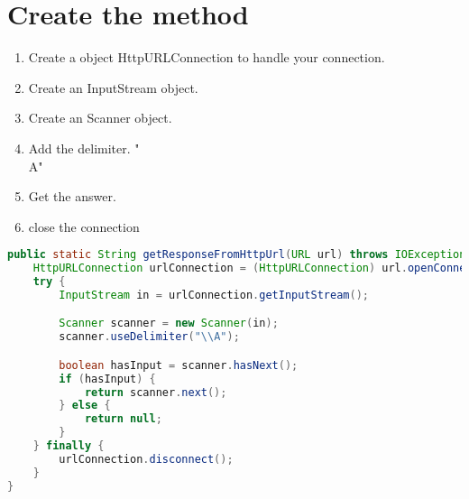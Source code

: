 \documentclass[12pt]{article} %
\begin{document}

\section{Create the method}

\begin{enumerate}
	\item Create a object HttpURLConnection to handle your connection.
	\item Create an InputStream object.
	\item Create an Scanner object.
	\item Add the delimiter. "\\A"
	\item Get the answer.
	\item close the connection
\end{enumerate}

\begin{lstlisting}[language=Java]
public static String getResponseFromHttpUrl(URL url) throws IOException {
	HttpURLConnection urlConnection = (HttpURLConnection) url.openConnection();
	try {
		InputStream in = urlConnection.getInputStream();

		Scanner scanner = new Scanner(in);
		scanner.useDelimiter("\\A");

		boolean hasInput = scanner.hasNext();
		if (hasInput) {
			return scanner.next();
		} else {
			return null;
		}
	} finally {
		urlConnection.disconnect();
	}
}
\end{lstlisting}
\end{document}
